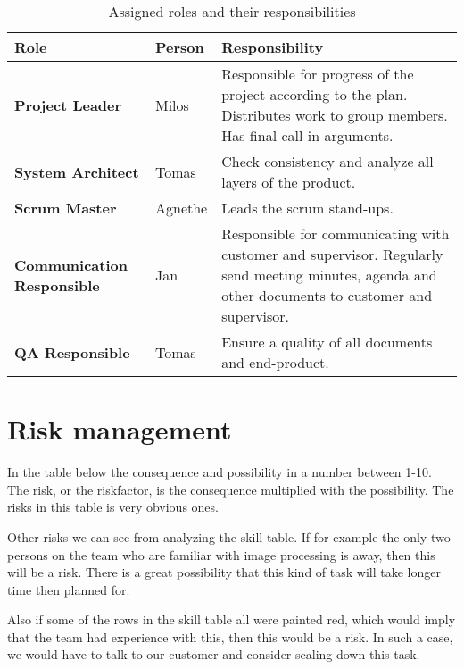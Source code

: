 \documentclass{article}
\newcommand{\ra}[1]{\renewcommand{\arraystretch}{#1}}
\begin{document}
\begin{table*}\centering \ra{1.3}
    \caption{Assigned roles and their responsibilities}
    \label{tab:roles}
    \vspace{2mm}
    \begin{tabularx}{\textwidth}{llX}
    \toprule
    Role    & Person   & Responsibility \\
    \midrule
    \textbf{Project Leader}             & Milos &
        Responsible for progress of the project according to the plan.
        Distributes work to group members.
        Has final call in arguments.\\
    \textbf{System Architect}             & Tomas &
        Check consistency and analyze all layers of the product. \\
    \textbf{Scrum Master}             & Agnethe &
        Leads the scrum stand-ups. \\
    \textbf{Communication Responsible}  & Jan &
        Responsible for communicating with customer and supervisor.
        Regularly send meeting minutes, agenda and other documents to customer and supervisor. \\ 
    \textbf{QA Responsible} & Tomas &
        Ensure a quality of all documents and end-product.
        \\ 
    \bottomrule
    \end{tabularx}
\end{table*}



\section{Risk management}

In the table below the consequence and possibility in a number between 1-10. The risk, or the riskfactor, is the consequence multiplied with the possibility. The risks in this table is very obvious ones. 

Other risks we can see from analyzing the skill table. If for example the only two persons on the team who are familiar with image processing is away, then this will be a risk. There is a great possibility that this kind of task will take longer time then planned for. 

Also if some of the rows in the skill table all were painted red, which would imply that the team had experience with this, then this would be a risk. In such a case, we would have to talk to our customer and consider scaling down this task. 
\end{document}
